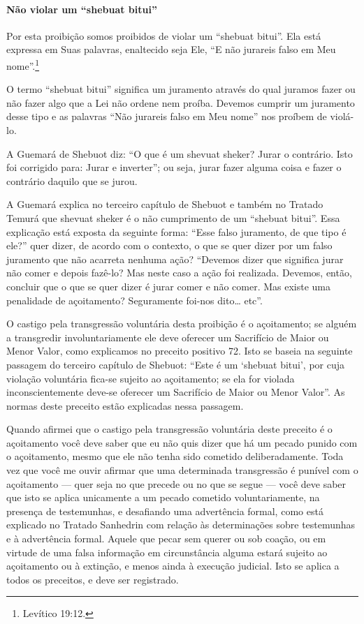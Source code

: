 \paragraph{Não violar um ``shebuat bitui''}

Por esta proibição somos proibidos de violar um ``shebuat bitui''. Ela
está expressa em Suas palavras, enaltecido seja Ele, ``E não jurareis
falso em Meu nome''.\footnote{Levítico 19:12.}

O termo ``shebuat bitui'' significa um juramento através do qual juramos
fazer ou não fazer algo que a Lei não ordene nem proíba. Devemos
cumprir um juramento desse tipo e as palavras ``Não jurareis falso em
Meu nome'' nos proíbem de violá-lo.

A Guemará de Shebuot diz: ``O que é um shevuat sheker\starr? Jurar o
contrário. Isto foi corrigido para: Jurar e inverter''; ou seja, jurar
fazer alguma coisa e fazer o contrário daquilo que se jurou.

A Guemará explica no terceiro capítulo de Shebuot e também no Tratado
Temurá que shevuat sheker\starr{} é o não cumprimento
de um ``shebuat bitui''. Essa explicação está exposta da seguinte forma:
``Esse falso juramento, de que tipo é ele?'' quer dizer, de acordo com o
contexto, o que se quer dizer por um falso juramento que não acarreta
nenhuma ação? ``Devemos dizer que significa jurar não comer e depois
fazê-lo? Mas neste caso a ação foi realizada. Devemos, então, concluir
que o que se quer dizer é jurar comer e não comer. Mas existe uma
penalidade de açoitamento? Seguramente foi-nos dito\ldots{} etc''.

O castigo pela transgressão voluntária desta proibição é o açoitamento; se alguém a transgredir involuntariamente ele deve oferecer um
Sacrifício de Maior ou Menor Valor, como explicamos no preceito
positivo 72. Isto se baseia na seguinte passagem do terceiro capítulo de
Shebuot: ``Este é um `shebuat bitui', por cuja violação voluntária
fica-se sujeito ao açoitamento; se ela for violada inconscientemente
deve-se oferecer um Sacrifício de Maior ou Menor Valor''. As normas
deste preceito estão explicadas nessa passagem.

Quando afirmei que o castigo pela transgressão voluntária deste preceito
é o açoitamento você deve saber que eu não quis dizer que há um pecado
punido com o açoitamento, mesmo que ele não tenha sido cometido
deliberadamente. Toda vez que você me ouvir afirmar que uma determinada
transgressão é punível com o açoitamento --- quer seja no que precede
ou no que se segue --- você deve saber que isto se aplica unicamente a
um pecado cometido voluntariamente, na presença de testemunhas, e
desafiando uma advertência formal, como está explicado no Tratado
Sanhedrin com relação às determinações sobre testemunhas e à
advertência formal. Aquele que pecar sem querer ou sob coação, ou em
virtude de uma falsa informação em circunstância alguma estará sujeito
ao açoitamento ou à extinção, e menos ainda à execução judicial. Isto
se aplica a todos os preceitos, e deve ser registrado.

